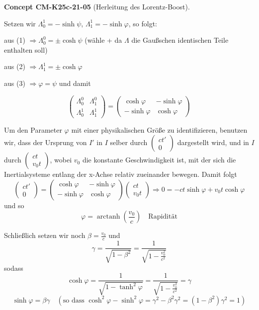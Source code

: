 \documentclass[10pt, letterpaper]{article}
\newcommand{\CustomHeading}[3]{%
  \par\medskip\noindent%
  \textbf{#1 #2} \textnormal{(#3)}.\enskip%
}
\newenvironment{CONC}[2]{\begin{unitbox}\CustomHeading{Concept}{#1}{#2}}{\end{unitbox}}
\begin{document}
\begin{CONC}{CM-K25c-21-05}{Herleitung des Lorentz-Boost}
Setzen wir $\Lambda^1_0 = -\sinh\psi$, $\Lambda^1_1 = -\sinh\varphi$, so folgt:

aus (1) $\Rightarrow \Lambda^0_0 = \pm\cosh\psi$ (wähle + da $\Lambda$ die Gaußschen identischen Teile enthalten soll)

aus (2) $\Rightarrow \Lambda^1_1 = \pm\cosh\varphi$

aus (3) $\Rightarrow \varphi = \psi$
und damit

\[
\begin{pmatrix}
\Lambda^0_0 & \Lambda^0_1 \\
\Lambda^1_0 & \Lambda^1_1
\end{pmatrix} = 
\begin{pmatrix}
\cosh\varphi & -\sinh\varphi \\
-\sinh\varphi & \cosh\varphi
\end{pmatrix}
\]

Um den Parameter $\varphi$ mit einer physikalischen Größe zu identifizieren, benutzen wir, dass der Ursprung von $I'$ in $I$ selber durch $\begin{pmatrix} ct' \\ 0 \end{pmatrix}$ dargestellt wird, und in $I$ durch $\begin{pmatrix} ct \\ v_0t \end{pmatrix}$, wobei $v_0$ die konstante Geschwindigkeit ist, mit der sich die Inertialsysteme entlang der x-Achse relativ zueinander bewegen. Damit folgt
\[
\begin{pmatrix} ct' \\ 0 \end{pmatrix} = 
\begin{pmatrix}
\cosh\varphi & -\sinh\varphi \\
-\sinh\varphi & \cosh\varphi
\end{pmatrix}
\begin{pmatrix} ct \\ v_0t \end{pmatrix} \Rightarrow 0 = -ct\sinh\varphi + v_0t\cosh\varphi
\]
und so
\[
\varphi = \operatorname{arctanh}\left(\frac{v_0}{c}\right) \quad \text{Rapidität}
\]

Schließlich setzen wir noch $\beta = \frac{v_0}{c}$ und
$$\gamma = \frac{1}{\sqrt{1-\beta^2}} = \frac{1}{\sqrt{1-\frac{v_0^2}{c^2}}}$$
sodass
\[
\cosh\varphi = \frac{1}{\sqrt{1-\tanh^2\varphi}} = \frac{1}{\sqrt{1-\frac{v_0^2}{c^2}}} = \gamma
\]
\[
\sinh\varphi = \beta\gamma \quad (\text{so dass } \cosh^2\varphi-\sinh^2\varphi = \gamma^2-\beta^2\gamma^2 = (1-\beta^2)\gamma^2=1)
\]


\end{CONC}
\end{document}
